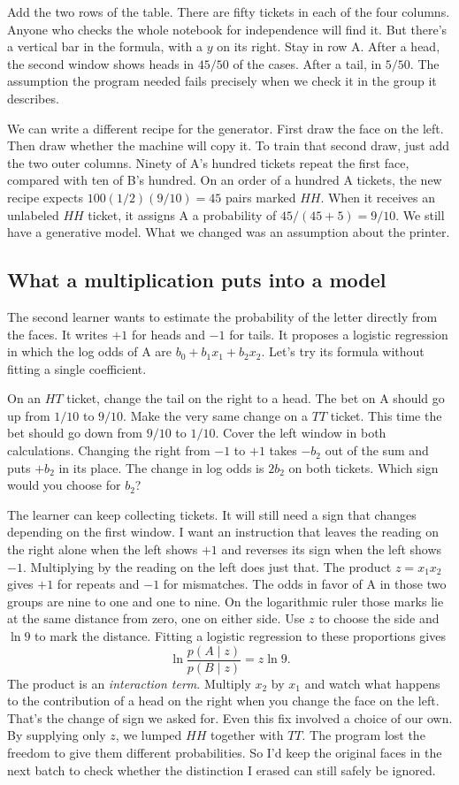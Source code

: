 \documentclass[12pt,oneside]{article}
\newcommand{\secao}[1]{\Needspace{5.2\baselineskip}\subsection*{#1}}
\begin{document}
Add the two rows of the table. There are fifty tickets in each of the four columns. Anyone who checks the whole notebook for independence will find it. But there's a vertical bar in the formula, with a $y$ on its right. Stay in row A. After a head, the second window shows heads in $45/50$ of the cases. After a tail, in $5/50$. The assumption the program needed fails precisely when we check it in the group it describes.

We can write a different recipe for the generator. First draw the face on the left. Then draw whether the machine will copy it. To train that second draw, just add the two outer columns. Ninety of A's hundred tickets repeat the first face, compared with ten of B's hundred. On an order of a hundred A tickets, the new recipe expects $100(1/2)(9/10)=45$ pairs marked $HH$. When it receives an unlabeled $HH$ ticket, it assigns A a probability of $45/(45+5)=9/10$. We still have a generative model. What we changed was an assumption about the printer.

\secao{What a multiplication puts into a model}
The second learner wants to estimate the probability of the letter directly from the faces. It writes $+1$ for heads and $-1$ for tails. It proposes a logistic regression in which the log odds of A are $b_0+b_1x_1+b_2x_2$. Let's try its formula without fitting a single coefficient.

On an $HT$ ticket, change the tail on the right to a head. The bet on A should go up from $1/10$ to $9/10$. Make the very same change on a $TT$ ticket. This time the bet should go down from $9/10$ to $1/10$. Cover the left window in both calculations. Changing the right from $-1$ to $+1$ takes $-b_2$ out of the sum and puts $+b_2$ in its place. The change in log odds is $2b_2$ on both tickets. Which sign would you choose for $b_2$?

The learner can keep collecting tickets. It will still need a sign that changes depending on the first window. I want an instruction that leaves the reading on the right alone when the left shows $+1$ and reverses its sign when the left shows $-1$. Multiplying by the reading on the left does just that. The product $z=x_1x_2$ gives $+1$ for repeats and $-1$ for mismatches. The odds in favor of A in those two groups are nine to one and one to nine. On the logarithmic ruler those marks lie at the same distance from zero, one on either side. Use $z$ to choose the side and $\ln 9$ to mark the distance. Fitting a logistic regression to these proportions gives
\[
              \ln\frac{p(A\mid z)}{p(B\mid z)}=z\ln 9 .
\]
The product is an \emph{interaction term}. Multiply $x_2$ by $x_1$ and watch what happens to the contribution of a head on the right when you change the face on the left. That's the change of sign we asked for. Even this fix involved a choice of our own. By supplying only $z$, we lumped $HH$ together with $TT$. The program lost the freedom to give them different probabilities. So I'd keep the original faces in the next batch to check whether the distinction I erased can still safely be ignored.
\end{document}
